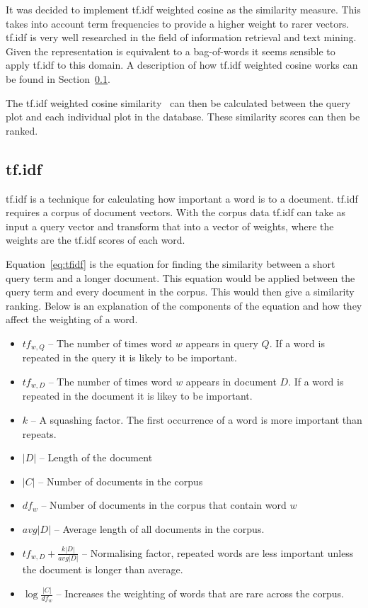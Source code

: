 It was decided to implement tf.idf weighted cosine as the similarity measure.  This takes into account term frequencies to provide a higher weight to rarer vectors.  tf.idf is very well researched in the field of information retrieval and text mining.  Given the representation is equivalent to a bag-of-words it seems sensible to apply tf.idf to this domain.  A description of how tf.idf weighted cosine works can be found in Section~\ref{sec:tfidf}.

The tf.idf weighted cosine similarity~\cite[p.~243]{se_book} can then be calculated between the query plot and each individual plot in the database.  These similarity scores can then be ranked.

\subsection{tf.idf}
\label{sec:tfidf}

\ac{tf.idf} is a technique for calculating how important a word is to a document.  \ac{tf.idf} requires a corpus of document vectors.  With the corpus data \ac{tf.idf} can take as input a query vector and transform that into a vector of weights, where the weights are the \ac{tf.idf} scores of each word.


Equation~\ref{eq:tfidf} is the equation for finding the similarity between a short query term and a longer document.  This equation would be applied between the query term and every document in the corpus.  This would then give a similarity ranking.  Below is an explanation of the components of the equation and how they affect the weighting of a word.

\begin{itemize}
    \item $tf_{w,Q}$ -- The number of times word $w$ appears in query $Q$.  If a word is repeated in the query it is likely to be important.
    \item $tf_{w,D}$ -- The number of times word $w$ appears in document $D$.  If a word is repeated in the document it is likey to be important.
    \item $k$ -- A squashing factor.  The first occurrence of a word is more important than repeats.
    \item $|D|$ -- Length of the document
    \item $|C|$ -- Number of documents in the corpus
    \item $df_{w}$ -- Number of documents in the corpus that contain word $w$
    \item $avg|D|$ -- Average length of all documents in the corpus.
    \item $tf_{w,D} + \frac{k|D|}{avg|D|}$ -- Normalising factor, repeated words are less important unless the document is longer than average.
    \item $\log \frac{|C|}{df_{w}}$ -- Increases the weighting of words that are rare across the corpus.
\end{itemize}


